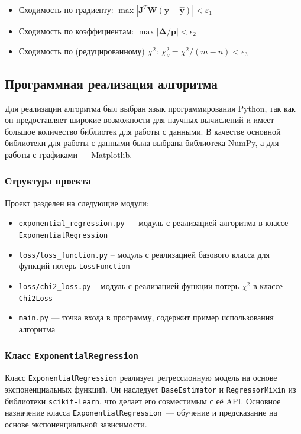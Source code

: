\begin{itemize}
	\item Сходимость по градиенту: $\operatorname{max}|\mathbf{J}^T\mathbf{W}(\boldsymbol{y}-\boldsymbol{\hat{y}})| < \varepsilon_1$
	\item Сходимость по коэффициентам: $\operatorname{max}|{\boldsymbol{\Delta}}/\mathbf{p}| < \epsilon_2$
	\item Сходимость по (редуцированному) $\chi^2$: $\chi^2_{\nu}=\chi^2/(m-n) < \epsilon_3$
\end{itemize}

\subsection{Программная реализация алгоритма}

Для реализации алгоритма был выбран язык программирования Python, так как он предоставляет широкие возможности для научных вычислений и имеет большое количество библиотек для работы с данными. В качестве основной библиотеки для работы с данными была выбрана библиотека NumPy, а для работы с графиками — Matplotlib.

\subsubsection{Структура проекта}

Проект разделен на следующие модули:

\begin{itemize}
	\item \texttt{exponential\_regression.py} — модуль с реализацией алгоритма в классе \texttt{ExponentialRegression}
	\item \texttt{loss/loss\_function.py} -- модуль с реализацией базового класса для функций потерь \texttt{LossFunction}
	\item \texttt{loss/chi2\_loss.py} -- модуль с реализацией функции потерь $\chi^2$ в классе \texttt{Chi2Loss}
	\item \texttt{main.py} — точка входа в программу, содержит пример использования алгоритма
\end{itemize}

\subsubsection{Класс \texttt{ExponentialRegression}}

Класс \texttt{ExponentialRegression} реализует регрессионную модель на основе экспоненциальных функций. Он наследует \texttt{BaseEstimator} и \texttt{RegressorMixin} из библиотеки \texttt{scikit-learn}, что делает его совместимым с её API. Основное назначение класса \texttt{ExponentialRegression}~--- обучение и предсказание на основе экспоненциальной зависимости.

